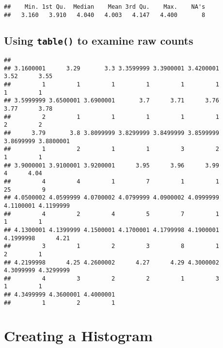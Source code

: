 \documentclass[
]{book}
\newenvironment{Shaded}{\begin{snugshade}}{\end{snugshade}}
\newcommand{\FunctionTok}[1]{\textcolor[rgb]{0.00,0.00,0.00}{#1}}
\newcommand{\NormalTok}[1]{#1}
\newcommand{\SpecialCharTok}[1]{\textcolor[rgb]{0.00,0.00,0.00}{#1}}
\begin{document}
\begin{verbatim}
##    Min. 1st Qu.  Median    Mean 3rd Qu.    Max.    NA's 
##   3.160   3.910   4.040   4.003   4.147   4.400       8
\end{verbatim}

\hypertarget{using-table-to-examine-raw-counts}{%
\subsection{\texorpdfstring{Using \texttt{table()} to examine raw counts}{Using table() to examine raw counts}}\label{using-table-to-examine-raw-counts}}

\begin{Shaded}
\end{Shaded}

\begin{verbatim}
## 
## 3.1600001      3.29       3.3 3.3599999 3.3900001 3.4200001      3.52      3.55 
##         1         1         1         1         1         1         1         1 
## 3.5999999 3.6500001 3.6900001       3.7      3.71      3.76      3.77      3.78 
##         2         1         1         1         1         1         2         2 
##      3.79       3.8 3.8099999 3.8299999 3.8499999 3.8599999 3.8699999 3.8800001 
##         1         2         1         1         3         2         1         1 
## 3.9000001 3.9100001 3.9200001      3.95      3.96      3.99         4      4.04 
##         4         4         1         7         1         1        25         9 
## 4.0500002 4.0599999 4.0700002 4.0799999 4.0900002 4.0999999 4.1100001 4.1199999 
##         4         2         4         5         7         1         1         1 
## 4.1300001 4.1399999 4.1500001 4.1700001 4.1799998 4.1900001 4.1999998      4.21 
##         3         1         2         3         8         1         2         1 
## 4.2199998      4.25 4.2600002      4.27      4.29 4.3000002 4.3099999 4.3299999 
##         4         3         2         2         1         3         1         1 
## 4.3499999 4.3600001 4.4000001 
##         1         2         1
\end{verbatim}

\hypertarget{creating-a-histogram}{%
\section{Creating a Histogram}\label{creating-a-histogram}}
\end{document}
